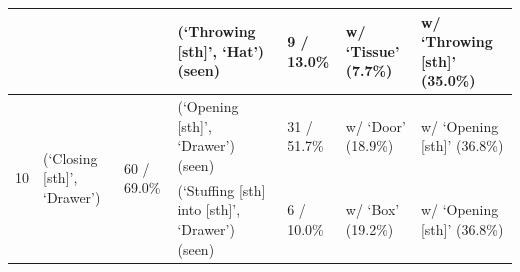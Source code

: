 \begin{table}[t]
{\begin{tabular}{l l l l l l l}
&&& (`Throwing [sth]', `Hat') (seen) & 9 / 13.0\% & w/ `Tissue' (7.7\%) & w/ `Throwing [sth]' (35.0\%) \\
\midrule
\multirow{2}{*}{10} & \multirow{2}{*}{(`Closing [sth]', `Drawer')} & \multirow{2}{*}{60 / 69.0\%} & (`Opening [sth]', `Drawer') (seen) & 31 / 51.7\% & w/ `Door' (18.9\%) & w/ `Opening [sth]' (36.8\%) \\
&&& (`Stuffing [sth] into [sth]', `Drawer') (seen) & 6 / 10.0\% & w/ `Box' (19.2\%) & w/ `Opening [sth]' (36.8\%) \\
\bottomrule
\end{tabular}
}
\label{tab:failure_mode_sth_com}
\end{table}
